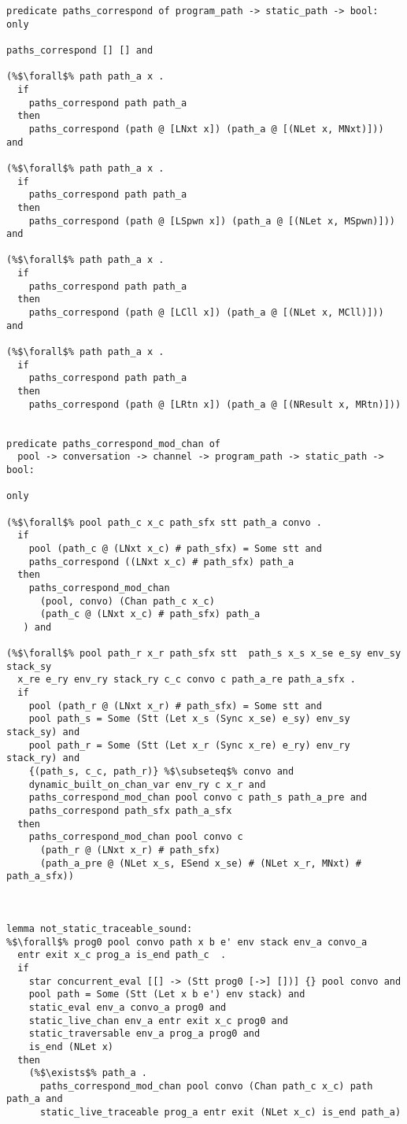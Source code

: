 \documentclass{article}
\begin{document}
\begin{lstlisting}[language=logic, style=codestyle1, escapechar=\%]
predicate paths_correspond of program_path -> static_path -> bool:
only

paths_correspond [] [] and

(%$\forall$% path path_a x .
  if
    paths_correspond path path_a
  then
    paths_correspond (path @ [LNxt x]) (path_a @ [(NLet x, MNxt)])) and

(%$\forall$% path path_a x .
  if
    paths_correspond path path_a
  then
    paths_correspond (path @ [LSpwn x]) (path_a @ [(NLet x, MSpwn)])) and

(%$\forall$% path path_a x .
  if
    paths_correspond path path_a
  then
    paths_correspond (path @ [LCll x]) (path_a @ [(NLet x, MCll)])) and

(%$\forall$% path path_a x .
  if
    paths_correspond path path_a
  then
    paths_correspond (path @ [LRtn x]) (path_a @ [(NResult x, MRtn)]))


predicate paths_correspond_mod_chan of 
  pool -> conversation -> channel -> program_path -> static_path -> bool:

only

(%$\forall$% pool path_c x_c path_sfx stt path_a convo .
  if
    pool (path_c @ (LNxt x_c) # path_sfx) = Some stt and
    paths_correspond ((LNxt x_c) # path_sfx) path_a
  then
    paths_correspond_mod_chan
      (pool, convo) (Chan path_c x_c)
      (path_c @ (LNxt x_c) # path_sfx) path_a
   ) and

(%$\forall$% pool path_r x_r path_sfx stt  path_s x_s x_se e_sy env_sy stack_sy
  x_re e_ry env_ry stack_ry c_c convo c path_a_re path_a_sfx . 
  if
    pool (path_r @ (LNxt x_r) # path_sfx) = Some stt and 
    pool path_s = Some (Stt (Let x_s (Sync x_se) e_sy) env_sy stack_sy) and
    pool path_r = Some (Stt (Let x_r (Sync x_re) e_ry) env_ry stack_ry) and
    {(path_s, c_c, path_r)} %$\subseteq$% convo and 
    dynamic_built_on_chan_var env_ry c x_r and 
    paths_correspond_mod_chan pool convo c path_s path_a_pre and
    paths_correspond path_sfx path_a_sfx
  then
    paths_correspond_mod_chan pool convo c
      (path_r @ (LNxt x_r) # path_sfx)
      (path_a_pre @ (NLet x_s, ESend x_se) # (NLet x_r, MNxt) # path_a_sfx))



lemma not_static_traceable_sound: 
%$\forall$% prog0 pool convo path x b e' env stack env_a convo_a
  entr exit x_c prog_a is_end path_c  . 
  if
    star concurrent_eval [[] -> (Stt prog0 [->] [])] {} pool convo and
    pool path = Some (Stt (Let x b e') env stack) and
    static_eval env_a convo_a prog0 and
    static_live_chan env_a entr exit x_c prog0 and
    static_traversable env_a prog_a prog0 and 
    is_end (NLet x)
  then
    (%$\exists$% path_a . 
      paths_correspond_mod_chan pool convo (Chan path_c x_c) path path_a and 
      static_live_traceable prog_a entr exit (NLet x_c) is_end path_a)



\end{lstlisting}
\end{document}
